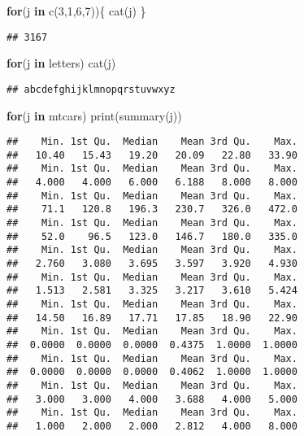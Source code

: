 \documentclass[]{article}
\newenvironment{Shaded}{\begin{snugshade}}{\end{snugshade}}
\newcommand{\ControlFlowTok}[1]{\textcolor[rgb]{0.13,0.29,0.53}{\textbf{#1}}}
\newcommand{\DecValTok}[1]{\textcolor[rgb]{0.00,0.00,0.81}{#1}}
\newcommand{\FunctionTok}[1]{\textcolor[rgb]{0.00,0.00,0.00}{#1}}
\newcommand{\NormalTok}[1]{#1}
\begin{document}
\begin{Shaded}
\begin{Highlighting}[]
\ControlFlowTok{for}\NormalTok{(j }\ControlFlowTok{in} \FunctionTok{c}\NormalTok{(}\DecValTok{3}\NormalTok{,}\DecValTok{1}\NormalTok{,}\DecValTok{6}\NormalTok{,}\DecValTok{7}\NormalTok{))\{}
  \FunctionTok{cat}\NormalTok{(j)}
\NormalTok{\}}
\end{Highlighting}
\end{Shaded}

\begin{verbatim}
## 3167
\end{verbatim}

\begin{Shaded}
\begin{Highlighting}[]
\ControlFlowTok{for}\NormalTok{(j }\ControlFlowTok{in}\NormalTok{ letters)}
  \FunctionTok{cat}\NormalTok{(j)}
\end{Highlighting}
\end{Shaded}

\begin{verbatim}
## abcdefghijklmnopqrstuvwxyz
\end{verbatim}

\begin{Shaded}
\begin{Highlighting}[]
\ControlFlowTok{for}\NormalTok{(j }\ControlFlowTok{in}\NormalTok{ mtcars)}
  \FunctionTok{print}\NormalTok{(}\FunctionTok{summary}\NormalTok{(j))}
\end{Highlighting}
\end{Shaded}

\begin{verbatim}
##    Min. 1st Qu.  Median    Mean 3rd Qu.    Max. 
##   10.40   15.43   19.20   20.09   22.80   33.90 
##    Min. 1st Qu.  Median    Mean 3rd Qu.    Max. 
##   4.000   4.000   6.000   6.188   8.000   8.000 
##    Min. 1st Qu.  Median    Mean 3rd Qu.    Max. 
##    71.1   120.8   196.3   230.7   326.0   472.0 
##    Min. 1st Qu.  Median    Mean 3rd Qu.    Max. 
##    52.0    96.5   123.0   146.7   180.0   335.0 
##    Min. 1st Qu.  Median    Mean 3rd Qu.    Max. 
##   2.760   3.080   3.695   3.597   3.920   4.930 
##    Min. 1st Qu.  Median    Mean 3rd Qu.    Max. 
##   1.513   2.581   3.325   3.217   3.610   5.424 
##    Min. 1st Qu.  Median    Mean 3rd Qu.    Max. 
##   14.50   16.89   17.71   17.85   18.90   22.90 
##    Min. 1st Qu.  Median    Mean 3rd Qu.    Max. 
##  0.0000  0.0000  0.0000  0.4375  1.0000  1.0000 
##    Min. 1st Qu.  Median    Mean 3rd Qu.    Max. 
##  0.0000  0.0000  0.0000  0.4062  1.0000  1.0000 
##    Min. 1st Qu.  Median    Mean 3rd Qu.    Max. 
##   3.000   3.000   4.000   3.688   4.000   5.000 
##    Min. 1st Qu.  Median    Mean 3rd Qu.    Max. 
##   1.000   2.000   2.000   2.812   4.000   8.000
\end{verbatim}
\end{document}
